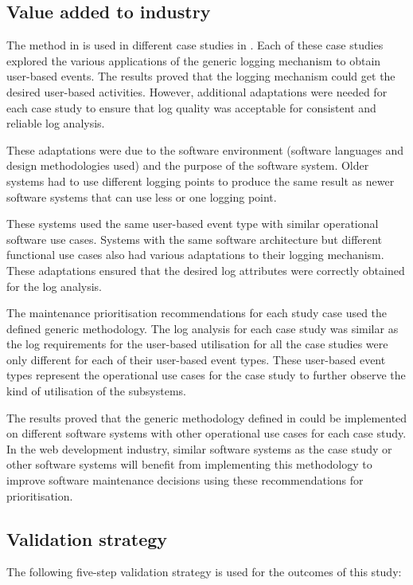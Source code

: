 \subsection{Value added to industry}
The method in  is used in different case studies in . Each of these case studies explored the various applications of the generic logging mechanism to obtain user-based events. The results proved that the logging mechanism could get the desired user-based activities. However, additional adaptations were needed for each case study to ensure that log quality was acceptable for consistent and reliable log analysis.\par These adaptations were due to the software environment (software languages and design methodologies used) and the purpose of the software system. Older systems had to use different logging points to produce the same result as newer software systems that can use less or one logging point.\par These systems used the same user-based event type with similar operational software use cases. Systems with the same software architecture but different functional use cases also had various adaptations to their logging mechanism. These adaptations ensured that the desired log attributes were correctly obtained for the log analysis. \par The maintenance prioritisation recommendations for each study case used the defined generic methodology. The log analysis for each case study was similar as the log requirements for the user-based utilisation for all the case studies were only different for each of their user-based event types. These user-based event types represent the operational use cases for the case study to further observe the kind of utilisation of the subsystems. \par The results proved that the generic methodology defined in  could be implemented on different software systems with other operational use cases for each case study. In the web development industry, similar software systems as the case study or other software systems will benefit from implementing this methodology to improve software maintenance decisions using these recommendations for prioritisation.

\subsection{Validation strategy}
The following five-step validation strategy is used for the outcomes of this study:

